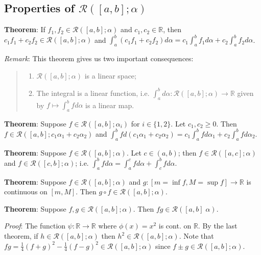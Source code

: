 \documentclass[11pt]{article}
\begin{document}
\subsection{Properties of $\mathcal{R}([a,b]; \alpha)$}

\textbf{Theorem}: If $f_1, f_2 \in \mathcal{R}([a,b]; \alpha)$ and $c_1, c_2 \in \mathbb{R}$, then\\
$c_1 f_1 + c_2 f_2 \in \mathcal{R}([a,b]; \alpha)$ and $\int_a^b (c_1 f_1 + c_2 f_2) d\alpha = c_1 \int_a^b f_1 d\alpha + c_2 \int_a^b f_2 d\alpha$.

\emph{Remark}: This theorem gives us two important consequences:
\begin{quote}\vspace{-0.3cm}
	\begin{enumerate}
	\item $\mathcal{R}([a,b]; \alpha)$ is a linear space;
	\item The integral is a linear function, i.e. $\int_a^b d\alpha : \mathcal{R}([a,b]; \alpha) \to \mathbb{R}$ given by $f \mapsto \int_a^b f d\alpha$ is a linear map.
	\end{enumerate}
\end{quote}

\textbf{Theorem}: Suppose $f \in \mathcal{R}([a,b]; \alpha_i)$ for $i \in \{1,2\}$. Let $c_1, c_2 \geq 0$. Then $f \in \mathcal{R}([a,b]; c_1 \alpha_1 + c_2 \alpha_2)$ and $\int_a^b f d(c_1 \alpha_1 + c_2 \alpha_2) = c_1 \int_a^b f d\alpha_1 + c_2 \int_a^b f d\alpha_2$.

\textbf{Theorem}: Suppose $f \in \mathcal{R}([a,b]; \alpha)$. Let $c \in (a,b)$; then $f \in \mathcal{R}([a,c]; \alpha)$ and $f \in \mathcal{R}([c,b]; \alpha)$; i.e. $\int_a^b f d\alpha = \int_a^c f d\alpha + \int_c^b f d\alpha$.

\textbf{Theorem}: Suppose $f \in \mathcal{R}([a,b]; \alpha)$ and $g : [m = \inf f, M = \sup f] \to \mathbb{R}$ is continuous on $[m, M]$. Then $g \circ f \in \mathcal{R}([a,b]; \alpha)$.

\textbf{Theorem}: Suppose $f, g \in \mathcal{R}([a,b]; \alpha)$. Then $fg \in \mathcal{R}([a,b]\; \alpha)$.

\emph{Proof}: The function $\psi : \mathbb{R} \to \mathbb{R}$ where $\phi(x) = x^2$ is cont. on $\mathbb{R}$. By the last theorem, if $h \in \mathcal{R}([a,b]; \alpha)$ then $h^2 \in \mathcal{R}([a,b]; \alpha)$. Note that $fg = \frac{1}{4}(f+g)^2 - \frac{1}{4} (f-g)^2 \in \mathcal{R}([a,b]; \alpha)$ since $f \pm g \in \mathcal{R}([a,b]; \alpha)$.
\end{document}

